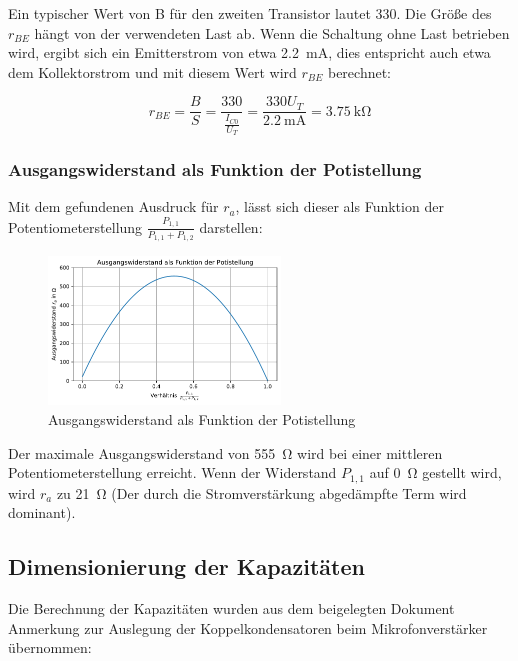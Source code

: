 Ein typischer Wert von B für den zweiten Transistor lautet 330. Die Größe des $r_{BE}$ hängt von der verwendeten Last ab. Wenn die Schaltung ohne Last betrieben wird, ergibt sich ein Emitterstrom von etwa \SI{2.2}{\milli \ampere}, dies entspricht auch etwa dem Kollektorstrom und mit diesem Wert wird $r_{BE}$ berechnet:

\begin{equation*}
    r_{BE} = \frac{B}{S} = \frac{330}{\frac{I_{C0}}{U_T}} = \frac{330 U_T}{\SI{2.2}{\milli \ampere}} = \SI{3.75}{\kilo \ohm}
\end{equation*}

\subsubsection{Ausgangswiderstand als Funktion der Potistellung}

Mit dem gefundenen Ausdruck für $r_a$, lässt sich dieser als Funktion der Potentiometerstellung $\frac{P_{1,1}}{P_{1,1}+P_{1,2}}$ darstellen:

\begin{figure}[H]
    \centering
    \includegraphics[width = 0.55\textwidth]{tex/1_Microphone/pictures/simple_plot.pdf}
    \caption{Ausgangswiderstand als Funktion der Potistellung}
    \label{fig:my_label}
\end{figure}

Der maximale Ausgangswiderstand von \SI{555}{\ohm} wird bei einer mittleren Potentiometerstellung erreicht. Wenn der Widerstand $P_{1,1}$ auf \SI{0}{\ohm} gestellt wird, wird $r_a$ zu \SI{21}{\ohm} (Der durch die Stromverstärkung abgedämpfte Term wird dominant).

\subsection{Dimensionierung der Kapazitäten}

Die Berechnung der Kapazitäten wurden aus dem beigelegten Dokument \glqq Anmerkung zur Auslegung der Koppelkondensatoren beim Mikrofonverstärker\grqq{} übernommen:

